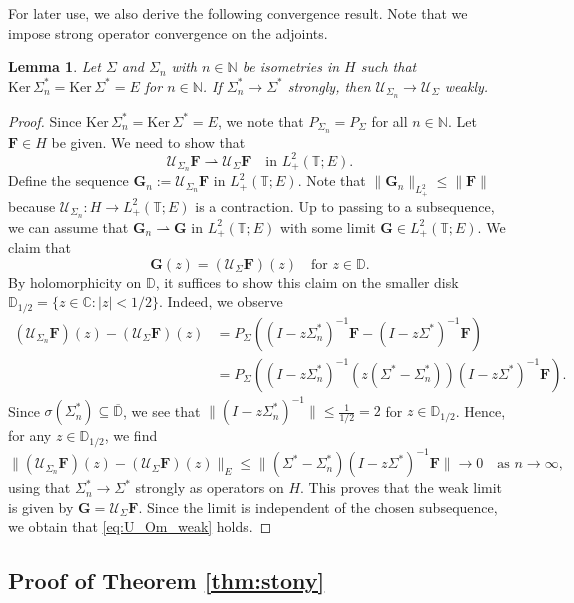 \documentclass[10pt,reqno,a4paper]{amsart}
\newtheorem{lem}{Lemma}[section]
\theoremstyle{definition}
\theoremstyle{remark}
\theoremstyle{remark}
\numberwithin{equation}{section}
\newcommand{\C}{\mathbb{C}}
\newcommand{\N}{\mathbb{N}}
\newcommand{\T}{\mathbb{T}}
\newcommand{\D}{\mathbb{D}}
\newcommand{\ov}{\overline}
\renewcommand{\ker}{\mathrm{Ker}}
\newcommand{\be}{\begin{equation}}
\newcommand{\ee}{\end{equation}}
\newcommand{\weakto}{\rightharpoonup}
\newcommand{\Fb}{\mathbf{F}}
\newcommand{\Gb}{\mathbf{G}}
\newcommand{\id}{I}
\newcommand{\Us}{\mathscr{U}}
\begin{document}
For later use, we also derive the following convergence result. Note that we impose strong operator convergence on the adjoints.

\begin{lem} \label{lem:Us_Sigma_conv}
Let $\Sigma$ and $\Sigma_n$ with $n \in \N$ be isometries in $H$ such that $\ker \, \Sigma^*_n = \ker \, \Sigma^* = E$ for $n \in \N$. If $\Sigma_n^* \to \Sigma^*$ strongly, then $\Us_{\Sigma_n} \to \Us_{\Sigma}$ weakly.
\end{lem}


\begin{proof}
Since $\ker \, \Sigma^*_n = \ker \, \Sigma^* = E$, we note that $P_{\Sigma_n} = P_{\Sigma}$ for all $n \in \N$. Let $\Fb \in H$ be given. We need to show that
\be \label{eq:U_Om_weak}
\Us_{\Sigma_n} \Fb \weakto \Us_\Sigma \Fb \quad  \mbox{in $L^2_+(\T;E)$}.
\ee
Define the sequence $\Gb_n := \Us_{\Sigma_n} \Fb$ in $L^2_+(\T;E)$. Note that $\| \Gb_n \|_{L^2_+} \leq \| \Fb \|$ because $\Us_{\Sigma_n} : H \to L^2_+(\T;E)$ is a contraction. Up to passing to a subsequence, we can assume that $\Gb_n \weakto \Gb$ in $L^2_+(\T;E)$ with some limit $\Gb \in L^2_+(\T;E)$. We claim that 
$$
\Gb(z) = (\Us_{\Sigma} \Fb)(z)  \quad \mbox{for $z \in \D$}.
$$ 
By holomorphicity on $\D$, it suffices to show this claim on the smaller disk $\D_{1/2} = \{ z \in \C : |z| < 1/2 \}$. Indeed, we observe
\begin{align*}
(\Us_{\Sigma_n} \Fb)(z) - (\Us_\Sigma \Fb)(z) & = P_{\Sigma} \left ( (\id-z \Sigma_n^*)^{-1} \Fb - (\id - z \Sigma^*)^{-1} \Fb \right ) \\
& = P_\Sigma \left ( (\id- z \Sigma_n^*)^{-1} (z(\Sigma^*- \Sigma_n^*)) (\id-z \Sigma^*)^{-1} \Fb \right ).
\end{align*}
Since $\sigma(\Sigma_n^*) \subseteq \ov{\D}$, we see that $\| (\id -z \Sigma_n^*)^{-1} \| \leq \frac{1}{1/2} = 2$ for $z \in \D_{1/2}$. Hence, for any $z \in \D_{1/2}$, we find
$$
\| (\Us_{\Sigma_n} \Fb)(z) - (\Us_{\Sigma} \Fb)(z)\|_E \leq  \| (\Sigma^*- \Sigma_n^*) (\id-z \Sigma^*)^{-1} \Fb \| \to 0 \quad \mbox{as $n \to \infty$},
$$
using that $\Sigma^*_n \to \Sigma^*$ strongly as operators on $H$. This proves that the weak limit is given by $\Gb = \Us_\Sigma \Fb$. Since the limit is independent of the chosen subsequence, we obtain that \eqref{eq:U_Om_weak} holds.
\end{proof}

\subsection{Proof of Theorem \ref{thm:stony}}
\end{document}
